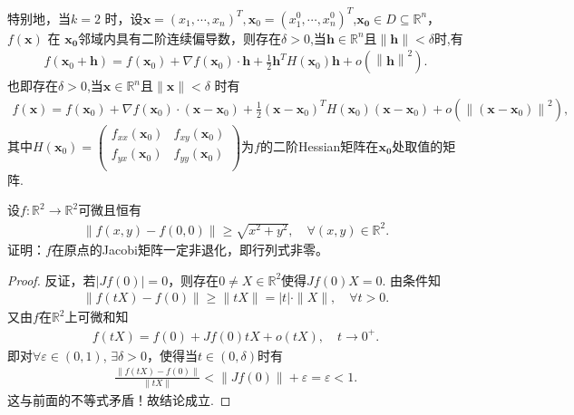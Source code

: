 \documentclass[../../main.tex]{subfiles}%
\begin{document}
\begin{theorem}[多元函数带Peano余项的Taylor公式]
特别地，当$k=2$ 时，设$\boldsymbol{x}=\left( x_1,\cdots,x_n \right)^T ,\boldsymbol{x}_0=\left( x_1^0,\cdots,x_n^0 \right)^T $,$\bm{x_0} \in D \subseteq \mathbb{R}^n$，$f(\bm{x})$ 在 $\bm{x_0}$邻域内具有二阶连续偏导数，则存在$\delta>0$,当$\bm{h}\in \mathbb{R}^n$且$\|\bm{h}\|<\delta$时,有
\begin{align*}
f\left( \boldsymbol{x}_0+\boldsymbol{h} \right) =f\left( \boldsymbol{x}_0 \right) +\nabla f\left( \boldsymbol{x}_0 \right) \cdot \boldsymbol{h}+\frac{1}{2}\boldsymbol{h}^TH\left( \boldsymbol{x}_0 \right) \boldsymbol{h}+o\left( \left\| \boldsymbol{h} \right\| ^2 \right) .
\end{align*}
也即存在$\delta>0$,当$\bm{x}\in \mathbb{R}^n$且$\|\bm{x}\|< \delta$ 时有
\begin{align*}
f\left( \boldsymbol{x} \right) =f\left( \boldsymbol{x}_0 \right) +\nabla f\left( \boldsymbol{x}_0 \right) \cdot \left( \boldsymbol{x}-\boldsymbol{x}_0 \right) +\frac{1}{2}\left( \boldsymbol{x}-\boldsymbol{x}_0 \right) ^TH\left( \boldsymbol{x}_0 \right) \left( \boldsymbol{x}-\boldsymbol{x}_0 \right) +o\left( \left\| \left( \boldsymbol{x}-\boldsymbol{x}_0 \right) \right\| ^2 \right) ,
\end{align*}
其中$H\left( \boldsymbol{x}_0 \right)=\left( \begin{matrix}
f_{xx}\left( \boldsymbol{x}_0 \right)&		f_{xy}\left( \boldsymbol{x}_0 \right)\\
f_{yx}\left( \boldsymbol{x}_0 \right)&		f_{yy}\left( \boldsymbol{x}_0 \right)\\
\end{matrix} \right) $为$f$的二阶Hessian矩阵在$\bm{x_0}$处取值的矩阵.
\end{theorem}

\begin{example}
设$f: \mathbb{R}^2 \to \mathbb{R}^2$可微且恒有
\begin{align*}
\|f(x,y) - f(0,0)\| \geqslant \sqrt{x^2 + y^2}, \quad \forall (x,y) \in \mathbb{R}^2.
\end{align*}
证明：$f$在原点的Jacobi矩阵一定非退化，即行列式非零。
\end{example}
\begin{proof}
反证，若$|Jf(0)| = 0$，则存在$0 \ne X \in \mathbb{R}^2$使得$Jf(0)X = 0$. 由条件知
\begin{align*}
\|f(tX) - f(0)\| \geqslant \|tX\| = |t| \cdot \|X\|, \quad \forall t > 0.
\end{align*}
又由$f$在$\mathbb{R}^2$上可微和知
\begin{align*}
f(tX) = f(0) + Jf(0)tX + o(tX), \quad t \to 0^+.
\end{align*}
即对$\forall \varepsilon \in (0,1)$, $\exists \delta > 0$，使得当$t \in (0,\delta)$时有
\begin{align*}
\frac{\|f(tX) - f(0)\|}{\|tX\|} < \|Jf(0)\| + \varepsilon = \varepsilon < 1.
\end{align*}
这与前面的不等式矛盾！故结论成立.
\end{proof}
\end{document}
